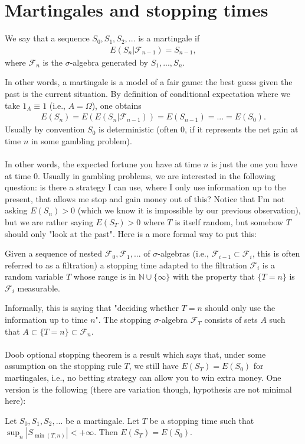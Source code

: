 \documentclass[12pt]{article}
\begin{document}
\section{Martingales and stopping times}
\begin{definition}
We say that a sequence $S_0, S_1, S_2,...$ is a martingale if 
\begin{align*}
E(S_n|\mathcal F_{n-1})=S_{n-1},
\end{align*}
where $\mathcal F_n$ is the $\sigma$-algebra generated by $S_1,..., S_{n}$.
\end{definition}
In other words, a martingale is a model of a fair game: the best guess given the past is the current situation. By definition of conditional expectation where we take $1_A\equiv 1$ (i.e., $A=\Omega$), one obtains
\begin{align*}
E(S_n)=E(E(S_n|\mathcal F_{n-1}))=E(S_{n-1})=...=E(S_0).
\end{align*}
Usually by convention $S_0$ is deterministic (often $0$, if it represents the net gain at time $n$ in some gambling problem).\\ \\
In other words, the expected fortune you have at time $n$ is just the one you have at time $0$. Usually in gambling problems, we are interested in the following question: is there a strategy I can use, where I only use information up to the present, that allows me stop and gain money out of this? Notice that I'm not asking $E(S_n)>0$ (which we know it is impossible by our previous observation), but we are rather saying $E(S_T)>0$ where $T$ is itself random, but somehow $T$ should only "look at the past". Here is a more formal way to put this:
\begin{definition}
Given a sequence of nested $\mathcal F_0, \mathcal F_1,...$ of $\sigma$-algebras (i.e., $\mathcal F_{i-1}\subset \mathcal F_i$, this is often referred to as a filtration) a stopping time adapted to the filtration $\mathcal F_i$ is a random variable $T$ whose range is in $\mathbb N\cup \{\infty\}$ with the property that $\{T=n\}$ is $\mathcal F_i$ measurable.
\end{definition}
Informally, this is saying that "deciding whether $T=n$ should only use the information up to time $n$". The stopping $\sigma$-algebra $\mathcal F_{T}$ consists of sets $A$ such that $A\subset \{T=n\}\subset \mathcal F_n$.\\ \\
Doob optional stopping theorem is a result which says that, under some assumption on the stopping rule $T$, we still have $E(S_T)=E(S_0)$ for martingales, i.e., no betting strategy can allow you to win extra money. One version is the following (there are variation though, hypothesis are not minimal here):
\begin{theorem}
Let $S_0, S_1, S_2,...$ be a martingale. Let $T$ be a stopping time such that $\sup_{n}|S_{\min(T,n)}|<+\infty$. Then $E(S_T)=E(S_0)$.
\end{theorem}
\end{document}

